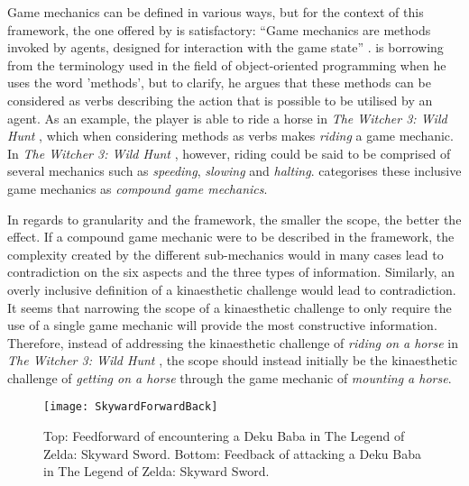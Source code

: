 Game mechanics can be defined in various ways, but for the context of this framework, the one offered by  is satisfactory: ``Game mechanics are methods invoked by agents, designed for interaction with the game state'' \cite{sicartmechanic}.  is borrowing from the terminology used in the field of object-oriented programming when he uses the word 'methods', but to clarify, he argues that these methods can be considered as verbs describing the action that is possible to be utilised by an agent. As an example, the player is able to ride a horse in \textit{The Witcher 3: Wild Hunt} \cite{witcher}, which when considering methods as verbs makes \textit{riding} a game mechanic. In \textit{The Witcher 3: Wild Hunt} \cite{witcher}, however, riding could be said to be comprised of several mechanics such as \textit{speeding}, \textit{slowing} and \textit{halting}.  categorises these inclusive game mechanics as \textit{compound game mechanics}.

In regards to granularity and the framework, the smaller the scope, the better the effect. If a compound game mechanic were to be described in the framework, the complexity created by the different sub-mechanics would in many cases lead to contradiction on the six aspects and the three types of information. Similarly, an overly inclusive definition of a kinaesthetic challenge would lead to contradiction. It seems that narrowing the scope of a kinaesthetic challenge to only require the use of a single game mechanic will provide the most constructive information. Therefore, instead of addressing the kinaesthetic challenge of \textit{riding on a horse} in \textit{The Witcher 3: Wild Hunt} \cite{witcher}, the scope should instead initially be the kinaesthetic challenge of \textit{getting on a horse} through the game mechanic of \textit{mounting a horse}.

\begin{figure}[h]
  \texttt{[image: SkywardForwardBack]}
  \caption{Top: Feedforward of encountering a Deku Baba in The Legend of Zelda: Skyward Sword. Bottom: Feedback of attacking a Deku Baba in The Legend of Zelda: Skyward Sword.}
  \label{SkywardForwardBack}
\end{figure}

